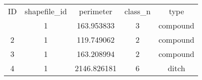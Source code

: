 \begin{tabular}{ccccc}
    \toprule
    ID & shapefile\_id & perimeter & class\_n & type\\
    \otoprule
    1 & 1 & 163.953833 & 3 & compound\\
    2 & 1 & 119.749062 & 2 & compound\\
    3 & 1 & 163.208994 & 2 & compound\\
    4 & 1 & 2146.826181 & 6 & ditch\\
    \bottomrule
\end{tabular}
